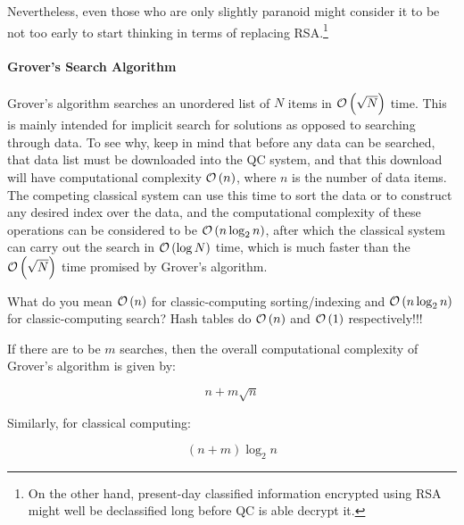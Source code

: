 Nevertheless, even those who are only slightly paranoid might consider
it to be not too early to start thinking in terms of replacing RSA.\footnote{
	On the other hand, present-day classified information encrypted
	using RSA might well be declassified long before QC is able
	decrypt it.}

\paragraph{Grover's Search Algorithm}
\label{sec:future:Grover's Search Algorithm}

Grover's algorithm searches an unordered list of $N$ items
in $\mathcal{O}\left(\sqrt N\right)$ time.
This is mainly intended for implicit search for solutions as opposed
to searching through data.
To see why, keep in mind that before any data can be searched,
that data list must be downloaded into the QC system, and that
this download will have computational complexity $\mathcal{O}\left(n\right)$, where
$n$ is the number of data items.
The competing classical system can use this time to sort the data
or to construct any desired index over the data, and the computational
complexity of these operations can be considered to be $\mathcal{O}\left(n \log_2 n\right)$,
after which the classical
system can carry out the search in $\mathcal{O}\left(\log N\right)$ time, which
is much faster than the $\mathcal{O}\left(\sqrt N\right)$ time promised by
Grover's algorithm.

\QuickQuiz{}
	What do you mean $\mathcal{O}\left(n\right)$ for classic-computing sorting/indexing
	and $\mathcal{O}\left(n \log_2 n\right)$ for classic-computing search?
	Hash tables do $\mathcal{O}\left(n\right)$ and $\mathcal{O}\left(1\right)$ respectively!!!
 \QuickQuizEnd

If there are to be $m$ searches, then the overall computational
complexity of Grover's algorithm is given by:

\begin{equation}
	n + m \sqrt n
\end{equation}

Similarly, for classical computing:

\begin{equation}
	\left( n + m \right) \log_2 n
\end{equation}

